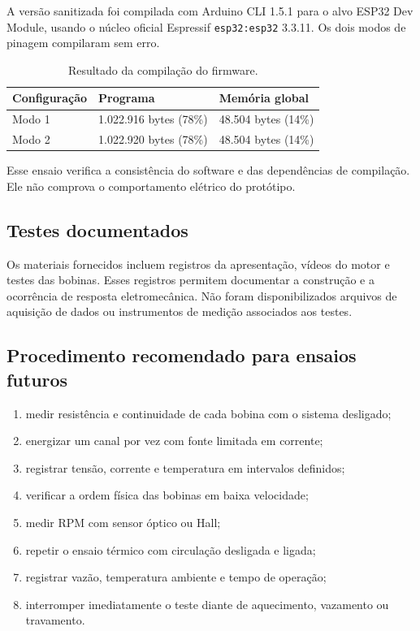 \documentclass[12pt,a4paper,oneside]{article}
\begin{document}
A versão sanitizada foi compilada com Arduino CLI 1.5.1 para o alvo ESP32 Dev Module, usando o núcleo oficial Espressif \texttt{esp32:esp32} 3.3.11. Os dois modos de pinagem compilaram sem erro.

\begin{table}[H]
\centering
\caption{Resultado da compilação do firmware.}
\begin{tabularx}{0.88\textwidth}{p{3cm} Y Y}
\toprule
Configuração & Programa & Memória global\\
\midrule
Modo 1 & 1.022.916 bytes (78\%) & 48.504 bytes (14\%)\\
Modo 2 & 1.022.920 bytes (78\%) & 48.504 bytes (14\%)\\
\bottomrule
\end{tabularx}
\end{table}

Esse ensaio verifica a consistência do software e das dependências de compilação. Ele não comprova o comportamento elétrico do protótipo.

\subsection{Testes documentados}

Os materiais fornecidos incluem registros da apresentação, vídeos do motor e testes das bobinas. Esses registros permitem documentar a construção e a ocorrência de resposta eletromecânica. Não foram disponibilizados arquivos de aquisição de dados ou instrumentos de medição associados aos testes.

\subsection{Procedimento recomendado para ensaios futuros}

\begin{enumerate}[leftmargin=1.4cm]
  \item medir resistência e continuidade de cada bobina com o sistema desligado;
  \item energizar um canal por vez com fonte limitada em corrente;
  \item registrar tensão, corrente e temperatura em intervalos definidos;
  \item verificar a ordem física das bobinas em baixa velocidade;
  \item medir RPM com sensor óptico ou Hall;
  \item repetir o ensaio térmico com circulação desligada e ligada;
  \item registrar vazão, temperatura ambiente e tempo de operação;
  \item interromper imediatamente o teste diante de aquecimento, vazamento ou travamento.
\end{enumerate}
\end{document}
